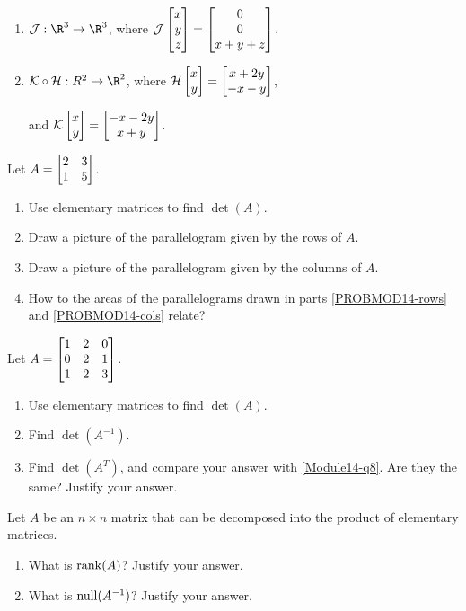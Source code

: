 \begin{exercises}
\begin{problist}
\begin{enumerate}
			\item $\mathcal J:\R^{3}\to\R^{3}$, where
				$\mathcal J\mat{x\\y\\z}=\matc{0\\0\\x+y+z}$.

			\item $\mathcal K\circ \mathcal H:R^{2}\to\R^{2}$, where
				$\mathcal H\mat{x\\y}=\matc{x+2y\\-x-y}$,

				and $\mathcal K\mat{x\\y}=\matc{-x-2y\\x+y}$.
		\end{enumerate}

		\prob Let $A=\mat{2&3\\1&5}$.
		\begin{enumerate}
			\item Use elementary matrices to find $\det(A)$.

			\item Draw a picture of the parallelogram given by the rows
				of $A$. 
				\label{PROBMOD14-rows}

			\item Draw a picture of the parallelogram given by the columns
				of $A$.
				\label{PROBMOD14-cols}
			\item How to the areas of the parallelograms drawn in parts \ref{PROBMOD14-rows} and
				\ref{PROBMOD14-cols} relate?
		\end{enumerate}

		\prob Let $A=\mat{1&2&0\\0&2&1\\1&2&3}$.
		\begin{enumerate}
			\item \label{Module14-q8} Use elementary matrices to
				find $\det(A)$.

			\item Find $\det(A^{-1})$.

			\item Find $\det(A^{T})$, and compare your answer with
				\ref{Module14-q8}. Are they the same? Justify
				your answer.
		\end{enumerate}

		\prob Let $A$ be an $n \times n$ matrix that can be decomposed into
		the product of elementary matrices.
		\begin{enumerate}
			\item What is $\operatorname{rank}(A)$? Justify your answer.

			\item What is $\operatorname{null}(A^{-1})$? Justify your answer.
		\end{enumerate}
	\end{problist}
\end{exercises}

